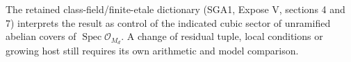 The retained class-field/finite-etale dictionary (SGA1, Expose V,
sections 4 and 7) interprets the result as control of the indicated
cubic sector of unramified abelian covers of
$\operatorname{Spec}\mathcal O_{M_d}$.
A change of residual tuple, local conditions or growing host
still requires its own arithmetic and model comparison.
